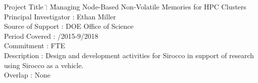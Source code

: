 \documentclass[10pt]{article}
\begin{document}
\begin{tabbing}
Project Title \hspace{5.5em}\=: \= Managing Node-Based Non-Volatile Memories for HPC Clusters\\
Principal Investigator      \>: \> Ethan Miller\\
Source of Support           \>: \> DOE Office of Science\\
Period Covered              \>: /2015-9/2018\\
Commitment                  \>:  FTE\\
Description                 \>: \> Design and development activities for Sirocco in support of research using Sirocco as a vehicle.\\
Overlap                     \>: \> None\\
\end{tabbing}
\end{document}
